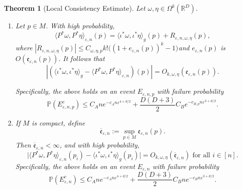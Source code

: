 \documentclass{article}
\newtheorem{theorem}{Theorem}
\theoremstyle{remark}
\theoremstyle{plain}
\begin{document}
\begin{theorem}[Local Consistency Estimate]
\label{thm:locla-consistency-estimate}
Let $\omega, \eta \in \Omega^{k}(\mathbb{R}^{D})$.
\begin{enumerate}
    \item[(1 - Pointwise)] Let $p \in M$. With high probability, \begin{equation}
        \langle P^{*}\omega, P^{*}\eta \rangle_{\varepsilon, n}(p) = \langle \iota^{*}\omega, \iota^{*}\eta \rangle_{g}(p)  +R_{\varepsilon, n, \omega, \eta}(p),
\label{eqn:local-pointwise-consistency}
    \end{equation} 
where $|R^{}_{\varepsilon, n, \omega, \eta}(p)|\leq C_{\omega, \eta, p} k!\big( (1+{e}_{\varepsilon, n}(p))^{k}-1\big)^{}$and $e_{\varepsilon,n}(p)$ is $O(\mathfrak{e}_{\varepsilon,n}(p))$. It follows that $$ | (\langle \iota^{*}\omega, \iota^{*}\eta \rangle_{g} - \langle P^{*}\omega, P^{*}\eta \rangle_{\varepsilon, n})(p) | =O_{k, \omega, \eta }(\mathfrak{e}_{\varepsilon, n}(p)).$$

Specifically, the above holds on an event $E_{\varepsilon, n,p}$ with failure probability $$\mathbb{P}(E_{\varepsilon, n, p}^{c}) \leq C_{A} n e ^{-c_{A}n \varepsilon^{4+d/2}}+ \frac{D(D+3)}{2} C_{B}e^{-c_{B, p}n \varepsilon^{3+d/2}}.$$
\item[(2 - Uniform)] If \(M\) is \emph{compact}, define \[\overline{\mathfrak{e}}_{\varepsilon,n}:=\sup_{p\in M} \mathfrak{e}_{\varepsilon,n}(p).\] Then \( \overline{\mathfrak{e}}_{\varepsilon, n} <\infty \), and with high probability,
\[\big|\langle P^{*}\omega, P^{*}\eta \rangle_{\varepsilon,n}(p_i)-\langle \iota^{*}\omega, \iota^{*}\eta \rangle_{g}(p_i)\big|=O_{ k,\omega, \eta}(\overline{\mathfrak{e}}_{\varepsilon, n})   \text{ for all } i\in[n]. \label{eqn:local-uniform-consistency}\]
Specifically, the above holds on an event \(E_{\varepsilon,n}\) with failure probability
\[
\mathbb{P}(E_{\varepsilon,n}^{c})
\le
C_{A} n e^{-c_{A}n \varepsilon^{4+d/2}}
+
\frac{D(D+3)}{2} C_{B} n e^{-c_{B}n \varepsilon^{3+d/2}}.
\]
\end{enumerate}






\end{theorem}
\end{document}
